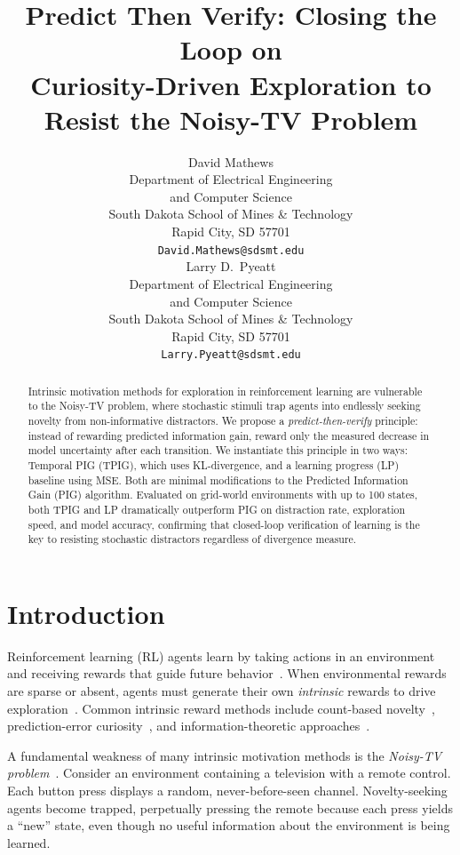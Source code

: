\documentclass[letterpaper]{article}
\title{Predict Then Verify: Closing the Loop on\\Curiosity-Driven Exploration to Resist the Noisy-TV Problem}
\author{%
  David Mathews \\
  Department of Electrical Engineering\\and Computer Science\\
  South Dakota School of Mines \& Technology\\
  Rapid City, SD 57701 \\
  \texttt{David.Mathews@sdsmt.edu} \\
  \And
  Larry D.\ Pyeatt \\
  Department of Electrical Engineering\\and Computer Science\\
  South Dakota School of Mines \& Technology\\
  Rapid City, SD 57701 \\
  \texttt{Larry.Pyeatt@sdsmt.edu} \\
}
\begin{document}
\maketitle

\begin{abstract}
Intrinsic motivation methods for exploration in reinforcement learning
are vulnerable to the Noisy-TV problem, where stochastic stimuli trap
agents into endlessly seeking novelty from non-informative distractors.
We propose a \emph{predict-then-verify} principle: instead of
rewarding predicted information gain, reward only the measured
decrease in model uncertainty after each transition.  We instantiate
this principle in two ways: Temporal PIG (TPIG), which uses
KL-divergence, and a learning progress (LP) baseline using MSE.
Both are minimal modifications to the Predicted Information Gain
(PIG) algorithm.  Evaluated on grid-world environments with up to
100 states, both TPIG and LP dramatically outperform PIG on
distraction rate, exploration speed, and model accuracy, confirming
that closed-loop verification of learning is the key to resisting
stochastic distractors regardless of divergence measure.
\end{abstract}

\section{Introduction}

Reinforcement learning (RL) agents learn by taking actions in an
environment and receiving rewards that guide future
behavior~\citep{Sutton1998,Kaelbling1996RLsurvey}.  When environmental
rewards are sparse or absent, agents must generate their own
\emph{intrinsic} rewards to drive
exploration~\citep{DBLP:journals/corr/abs-1908-06976,FToCFaIM:Jurgen,Oudeyer2007intrinsic}.
Common intrinsic reward methods include count-based
novelty~\citep{DBLP:journals/corr/TangHFSCDSTA16,Bellemare2016counting},
prediction-error
curiosity~\citep{Pathak2017ICM,Rein:VIME}, and information-theoretic
approaches~\citep{10.3389/fncir.2013.00037}.

A fundamental weakness of many intrinsic motivation methods is the
\emph{Noisy-TV problem}~\citep{Burda2019curiosity}.
Consider an environment containing a television with a remote control.
Each button press displays a random, never-before-seen channel.
Novelty-seeking agents become trapped, perpetually pressing the remote
because each press yields a ``new'' state, even though no useful
information about the environment is being learned.
\end{document}

